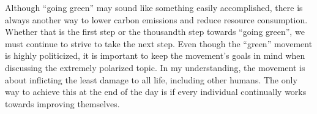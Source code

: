 \documentclass[11pt]{article}
\begin{document}
Although ``going green'' may sound like something easily accomplished, there is always another way to lower carbon emissions and reduce resource consumption. Whether that is the first step or the thousandth step towards ``going green'', we must continue to strive to take the next step. Even though the ``green'' movement is highly politicized, it is important to keep the movement's goals in mind when discussing the extremely polarized topic. In my understanding, the movement is about inflicting the least damage to all life, including other humans. The only way to achieve this at the end of the day is if every individual continually works towards improving themselves.
\end{document}
